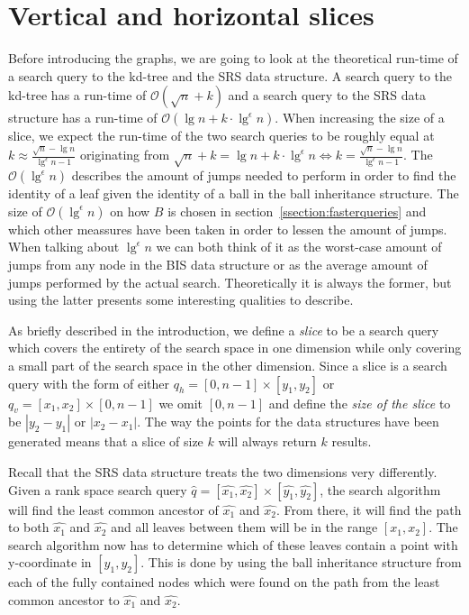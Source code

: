 \clearpage


\section{Vertical and horizontal slices}

Before introducing the graphs, we are going to look at the theoretical run-time of a search query to the kd-tree and the SRS data structure. A search query to the kd-tree has a run-time of $\mathcal{O}(\sqrt{n}+k)$ and a search query to the SRS data structure has a run-time of $\mathcal{O}(\lg n + k \cdot \lg^\epsilon n)$. When increasing the size of a slice, we expect the run-time of the two search queries to be roughly equal at $k \approx \frac{\sqrt{n} - \lg n}{\lg^\epsilon n - 1}$ originating from $\sqrt{n} + k = \lg n + k \cdot \lg^\epsilon n \Leftrightarrow k = \frac{\sqrt{n} - \lg n}{\lg^\epsilon n - 1}$. The $\mathcal{O}(\lg^\epsilon n)$ describes the amount of jumps needed to perform in order to find the identity of a leaf given the identity of a ball in the ball inheritance structure. The size of $\mathcal{O}(\lg^\epsilon n)$ on how $B$ is chosen in section~\ref{ssection:fasterqueries} and which other meassures have been taken in order to lessen the amount of jumps. When talking about $\lg^\epsilon n$ we can both think of it as the worst-case amount of jumps from any node in the BIS data structure or as the average amount of jumps performed by the actual search. Theoretically it is always the former, but using the latter presents some interesting qualities to describe.

As briefly described in the introduction, we define a \emph{slice} to be a search query which covers the entirety of the search space in one dimension while only covering a small part of the search space in the other dimension. Since a slice is a search query with the form of either $q_h = [0, n-1] \times [y_1, y_2]$ or $q_v = [x_1, x_2] \times [0, n-1]$ we omit $[0, n-1]$ and define the \emph{size of the slice} to be $\left| y_2-y_1\right|$ or $\left|x_2-x_1\right|$. The way the points for the data structures have been generated means that a slice of size $k$ will always return $k$ results.

Recall that the SRS data structure treats the two dimensions very differently. Given a rank space search query $\hat{q} = [\hat{x_1}, \hat{x_2}] \times [\hat{y_1}, \hat{y_2}]$, the search algorithm will find the least common ancestor of $\hat{x_1}$ and $\hat{x_2}$. From there, it will find the path to both $\hat{x_1}$ and $\hat{x_2}$ and all leaves between them will be in the range $[x_1, x_2]$. The search algorithm now has to determine which of these leaves contain a point with y-coordinate in $[y_1, y_2]$. This is done by using the ball inheritance structure from each of the fully contained nodes which were found on the path from the least common ancestor to $\hat{x_1}$ and $\hat{x_2}$.


